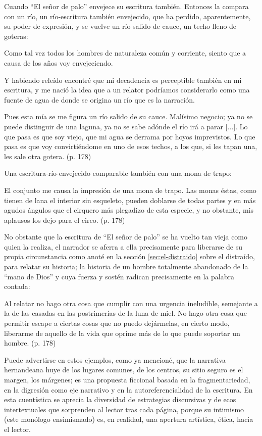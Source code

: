 \documentclass[14pt,twoside,final]{extbook} %
\begin{document}
Cuando ``El señor de palo'' envejece su escritura también. Entonces la compara con un río, un río-escritura también envejecido, que ha perdido, aparentemente, su poder de expresión, y se vuelve un río salido de cauce, un techo lleno de goteras:
\begin{quoting}
Como tal vez todos los hombres de naturaleza común y corriente, siento que a causa de los años voy envejeciendo.

Y habiendo releído encontré que mi decadencia es perceptible también en mi escritura, y me nació la idea que a un relator podríamos considerarlo como una fuente de agua de donde se origina un río que es la narración.

Pues esta mía se me figura un río salido de su cauce. Malísimo negocio; ya no se puede distinguir de una laguna, ya no se sabe adónde el río irá a parar [...]. Lo que pasa es que soy viejo, que mi agua se derrama por hoyos imprevistos. Lo que pasa es que voy convirtiéndome en uno de esos techos, a los que, si les tapan una, les sale otra gotera. (p. 178)
\end{quoting}
Una escritura-río-envejecido comparable también con una mona de trapo:
\begin{quoting}
El conjunto me causa la impresión de una mona de trapo. Las monas éstas, como tienen de lana el interior sin esqueleto, pueden doblarse de todas partes y en más agudos ángulos que el cirquero más plegadizo de esta especie, y no obstante, mis aplausos los dejo para el circo. (p. 178)
\end{quoting}
No obstante que la escritura de ``El señor de palo'' se ha vuelto tan vieja como quien la realiza, el narrador se aferra a ella precisamente para liberarse de su propia circunstancia como anoté en la sección \ref{sec:el-distraido} sobre el distraído, para relatar su historia; la historia de un hombre totalmente abandonado de la ``mano de Dios'' y cuya fuerza y sostén radican precisamente en la palabra contada:
\begin{quoting}
Al relatar no hago otra cosa que cumplir con una urgencia ineludible, semejante a la de las casadas en las postrimerías de la luna de miel. No hago otra cosa que permitir escape a ciertas cosas que no puedo dejármelas, en cierto modo, liberarme de aquello de la vida que oprime más de lo que puede soportar un hombre. (p. 178)
\end{quoting}
Puede advertirse en estos ejemplos, como ya mencioné, que la narrativa hernandeana huye de los lugares comunes, de los centros, su sitio seguro es el margen, los márgenes; es una propuesta ficcional basada en la fragmentariedad, en la digresión como eje narrativo y en la autoreferencialidad de la escritura. En esta cuentística se aprecia la diversidad de estrategias discursivas y de ecos intertextuales que sorprenden al lector tras cada página, porque su intimismo (este monólogo ensimismado) es, en realidad, una apertura artística, ética, hacia el lector.
\end{document}
